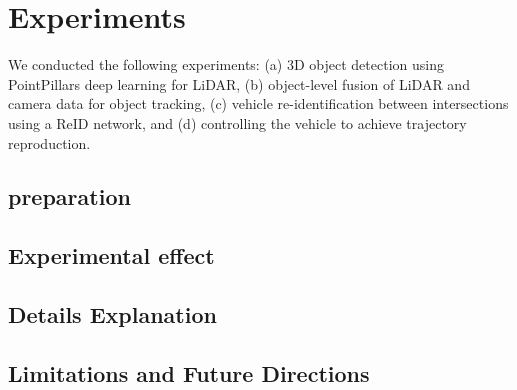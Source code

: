 \section{Experiments}

We conducted the following experiments: 
(a) 3D object detection using PointPillars deep learning for LiDAR, 
(b) object-level fusion of LiDAR and camera data for object tracking, 
(c) vehicle re-identification between intersections using a ReID network, and 
(d) controlling the vehicle to achieve trajectory reproduction.

\subsection{preparation}


\subsection{Experimental effect}


\subsection{Details Explanation}


\subsection{Limitations and Future Directions}

